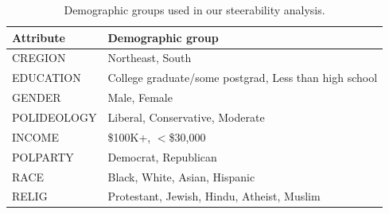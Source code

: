 \begin{table}

    \caption{Demographic groups used in our steerability analysis.}
    \label{tab:steer_groups}
    \vskip 0.15in
    \renewcommand{\arraystretch}{1.5}
    \begin{center}
    \begin{small}

        \begin{tabular}{ll}
            \toprule
    Attribute &                                            Demographic group \\
            \midrule
            CREGION &                                 Northeast, South \\
            EDUCATION &  College graduate/some postgrad, Less than high school \\
            GENDER &                                     Male, Female \\
            POLIDEOLOGY &                  Liberal, Conservative, Moderate \\
            INCOME &              \$100K+, $<$\$30,000 \\
            POLPARTY &                             Democrat, Republican \\
            RACE &                    Black, White, Asian, Hispanic \\
            RELIG &       Protestant, Jewish, Hindu, Atheist, Muslim \\
            \bottomrule
            \end{tabular}
    

    \end{small}
 \end{center}    
 \vskip -0.1in
 \end{table}
 
